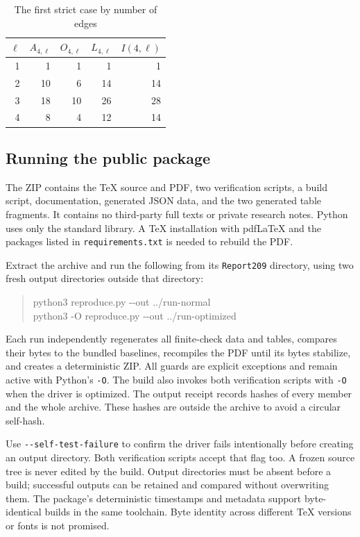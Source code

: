 \documentclass[11pt,letterpaper]{article}
\theoremstyle{remark}\newtheorem{remark}[theorem]{Remark}
\theoremstyle{definition}\newtheorem{definition}[theorem]{Definition}
\begin{document}
\begin{table}[htbp]\centering
\caption{The first strict case by number of edges}\label{sgm:sb:tab:coefficients}
\begin{tabular}{r r r r r}\toprule
$\ell$ & $A_{4,\ell}$ & $O_{4,\ell}$ & $L_{4,\ell}$ & $I(4,\ell)$ \\\midrule
1 & 1 & 1 & 1 & 1 \\
2 & 10 & 6 & 14 & 14 \\
3 & 18 & 10 & 26 & 28 \\
4 & 8 & 4 & 12 & 14 \\
\bottomrule\end{tabular}\end{table}

\subsection{Running the public package}
The ZIP contains the TeX source and PDF, two verification scripts, a build script, documentation, generated JSON data, and the two generated table fragments. It contains no third-party full texts or private research notes. Python uses only the standard library. A TeX installation with pdfLaTeX and the packages listed in \texttt{requirements.txt} is needed to rebuild the PDF.

Extract the archive and run the following from its \texttt{Report209} directory, using two fresh output directories outside that directory:
\begin{quote}\ttfamily\small
python3 reproduce.py -{}-out ../run-normal\\
python3 -O reproduce.py -{}-out ../run-optimized
\end{quote}
Each run independently regenerates all finite-check data and tables, compares their bytes to the bundled baselines, recompiles the PDF until its bytes stabilize, and creates a deterministic ZIP. All guards are explicit exceptions and remain active with Python's \texttt{-O}. The build also invokes both verification scripts with \texttt{-O} when the driver is optimized. The output receipt records hashes of every member and the whole archive. These hashes are outside the archive to avoid a circular self-hash.

Use \texttt{-{}-self-test-failure} to confirm the driver fails intentionally before creating an output directory. Both verification scripts accept that flag too. A frozen source tree is never edited by the build. Output directories must be absent before a build; successful outputs can be retained and compared without overwriting them. The package's deterministic timestamps and metadata support byte-identical builds in the same toolchain. Byte identity across different TeX versions or fonts is not promised.
\end{document}
